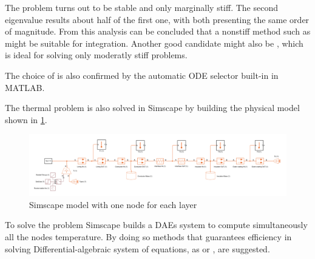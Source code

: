 \documentclass[11pt,a4paper,oneside]{article}
\begin{document}
The problem turns out to be stable and only marginally stiff.
The second eigenvalue results about half of the first one, with both presenting the same order of magnitude.
From this analysis can be concluded that a nonstiff method such as  might be suitable for integration.
Another good candidate might also be , which is ideal for solving only moderatly stiff problems.

The choice of  is also confirmed by the automatic ODE selector built-in in MATLAB.

The thermal problem is also solved in Simscape by building the physical model shown in \cref{fig:ex1_simscapeCase1}.
\begin{figure}[htb]
    \centering
    \includegraphics*[width=1\textwidth, keepaspectratio]{Figures/ex1_simscapeCase1.pdf}
    \caption[]{\label{fig:ex1_simscapeCase1} Simscape model with one node for each layer}
\end{figure}

To solve the problem Simscape builds a DAEs system to compute simultaneously all the nodes temperature.
By doing so methods that guarantees efficiency in solving Differential-algebraic system of equations, as  or , are suggested. 
\end{document}
